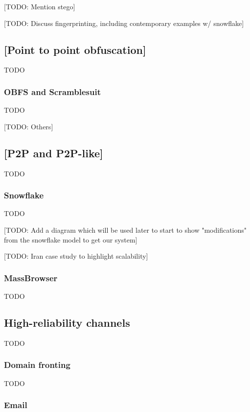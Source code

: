 \documentclass[12pt]{report}
\begin{document}
[TODO: Mention stego]

[TODO: Discuss fingerprinting, including contemporary examples w/ snowflake]

\subsection{[Point to point obfuscation]}

TODO

\subsubsection{OBFS and Scramblesuit}

TODO

[TODO: Others]

\subsection{[P2P and P2P-like]}

TODO

\subsubsection{Snowflake}

TODO

[TODO: Add a diagram which will be used later to start to show "modifications" from the snowflake model to get our system]

[TODO: Iran case study to highlight scalability]

\subsubsection{MassBrowser}

TODO

\subsection{High-reliability channels}

TODO

\subsubsection{Domain fronting}

TODO

\subsubsection{Email}
\end{document}
